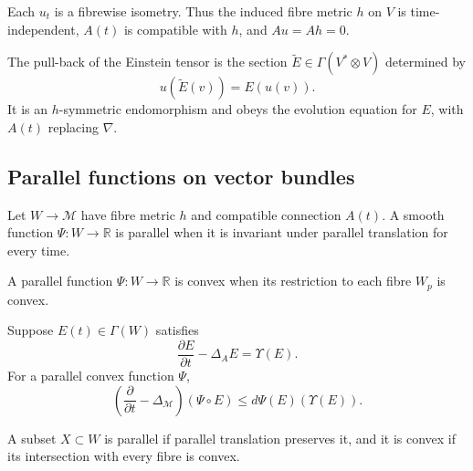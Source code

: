 \begin{remark}
\label{topping-ch9-uhlenbeck-metric}
Each \(u_t\) is a fibrewise isometry. Thus the induced fibre metric \(h\) on
\(V\) is time-independent, \(A(t)\) is compatible with \(h\), and
\(Au=Ah=0\).
\end{remark}

\begin{definition}
\label{topping-ch9-pulled-back-einstein}
The pull-back of the Einstein tensor is the section
\(\widetilde E\in\Gamma(V^*\otimes V)\) determined by
\[
u(\widetilde E(v))=E(u(v)).
\]
It is an \(h\)-symmetric endomorphism and obeys the evolution equation for
\(E\), with \(A(t)\) replacing \(\nabla\).
\end{definition}

\subsection{Parallel functions on vector bundles}

\begin{definition}
\label{topping-ch9-parallel-function}
Let \(W\to\mathcal M\) have fibre metric \(h\) and compatible connection
\(A(t)\). A smooth function \(\Psi:W\to\mathbb R\) is parallel when it is
invariant under parallel translation for every time.
\end{definition}

\begin{definition}
\label{topping-ch9-convex-parallel-function}
A parallel function \(\Psi:W\to\mathbb R\) is convex when its restriction
to each fibre \(W_p\) is convex.
\end{definition}

\begin{proposition}
\label{topping-ch9-parallel-composition-parabolic}
Suppose \(E(t)\in\Gamma(W)\) satisfies
\[
\frac{\partial E}{\partial t}-\Delta_AE=\Upsilon(E).
\]
For a parallel convex function \(\Psi\),
\[
\left(\frac{\partial}{\partial t}-\Delta_{\mathcal M}\right)(\Psi\circ E)
\le d\Psi(E)\!\left(\Upsilon(E)\right).
\]
\end{proposition}

\begin{definition}
\label{topping-ch9-parallel-convex-subset}
A subset \(X\subset W\) is parallel if parallel translation preserves it, and
it is convex if its intersection with every fibre is convex.
\end{definition}

